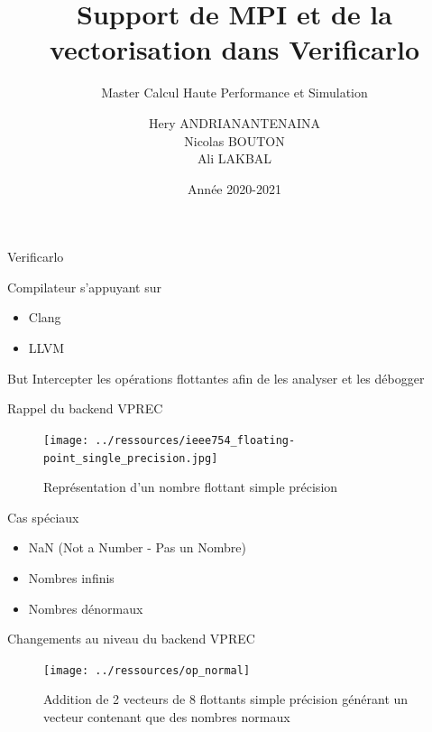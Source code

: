 \documentclass{beamer}
\title[Support pour Verificarlo]{Support de MPI et de la vectorisation dans Verificarlo}
\subtitle{Master Calcul Haute Performance et Simulation}
\author[Hery, Nicolas, Ali]{Hery ANDRIANANTENAINA \\ Nicolas BOUTON \\ Ali LAKBAL}
\institute[]{\textbf{Encadrant:} Eric PETIT}
\date{Année 2020-2021}
\begin{document}
\maketitle

\begin{frame}{Verificarlo}

  \begin{block}{Compilateur s'appuyant sur}
    \begin{itemize}
    \item Clang
    \item LLVM
    \end{itemize}
  \end{block}

  \begin{block}{But}
    Intercepter les opérations flottantes afin de les analyser et les débogger
  \end{block}
  
\end{frame}

\begin{frame}{Rappel du backend VPREC}

  \begin{figure}
    \centering
    \texttt{[image: ../ressources/ieee754\_floating-point\_single\_precision.jpg]}
    \caption{\label{fig:ieee754_single_precision}Représentation d'un nombre flottant simple précision}
  \end{figure}

  \begin{block}{Cas spéciaux}
    \begin{itemize}
    \item NaN (Not a Number - Pas un Nombre)
    \item Nombres infinis
    \item Nombres dénormaux
    \end{itemize}
  \end{block}

\end{frame}

\begin{frame}{Changements au niveau du backend VPREC}

  \begin{figure}
    \centering
    \texttt{[image: ../ressources/op\_normal]}
    \caption{\label{fig:ieee_simple_precision}Addition de 2 vecteurs de 8
      flottants simple précision générant un vecteur contenant que des nombres normaux}
  \end{figure}

\end{frame}
\end{document}

